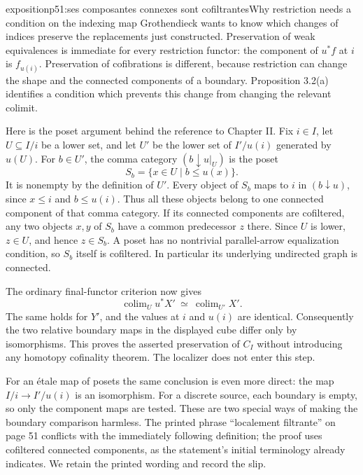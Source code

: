 \begin{dcomment}{exposition}{p51:ses composantes connexes sont cofiltrantes}{Why restriction needs a condition on the indexing map}
Grothendieck wants to know which changes of indices preserve the replacements just constructed. Preservation of weak equivalences is immediate for every restriction functor: the component of $u^*f$ at $i$ is $f_{u(i)}$. Preservation of cofibrations is different, because restriction can change the shape and the connected components of a boundary. Proposition 3.2(a) identifies a condition which prevents this change from changing the relevant colimit.

Here is the poset argument behind the reference to Chapter II. Fix $i\in I$, let $U\subseteq I/i$ be a lower set, and let $U'$ be the lower set of $I'/u(i)$ generated by $u(U)$. For $b\in U'$, the comma category $(b\downarrow u|_U)$ is the poset
\[
 S_b=\{x\in U\mid b\leq u(x)\}.
\]
It is nonempty by the definition of $U'$. Every object of $S_b$ maps to $i$ in $(b\downarrow u)$, since $x\leq i$ and $b\leq u(i)$. Thus all these objects belong to one connected component of that comma category. If its connected components are cofiltered, any two objects $x,y$ of $S_b$ have a common predecessor $z$ there. Since $U$ is lower, $z\in U$, and hence $z\in S_b$. A poset has no nontrivial parallel-arrow equalization condition, so $S_b$ itself is cofiltered. In particular its underlying undirected graph is connected.

The ordinary final-functor criterion now gives
\[
 \operatorname{colim}_{U}u^*X'\ \simeq\
 \operatorname{colim}_{U'}X'.
\]
The same holds for $Y'$, and the values at $i$ and $u(i)$ are identical. Consequently the two relative boundary maps in the displayed cube differ only by isomorphisms. This proves the asserted preservation of $C_I$ without introducing any homotopy cofinality theorem. The localizer does not enter this step.

For an étale map of posets the same conclusion is even more direct: the map $I/i\to I'/u(i)$ is an isomorphism. For a discrete source, each boundary is empty, so only the component maps are tested. These are two special ways of making the boundary comparison harmless. The printed phrase ``localement filtrante'' on page 51 conflicts with the immediately following definition; the proof uses cofiltered connected components, as the statement's initial terminology already indicates. We retain the printed wording and record the slip.
\end{dcomment}

